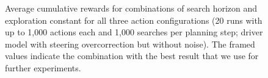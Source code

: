 \begin{figure}[htbp]
    \caption[Average cumulative rewards for combinations of search horizon and exploration constant]{Average cumulative rewards for combinations of search horizon and exploration constant for all three action configurations (20 runs with up to 1,000 actions each and 1,000 searches per planning step; driver model with steering overcorrection but without noise). The framed values indicate the combination with the best result that we use for further experiments.}
\end{figure}